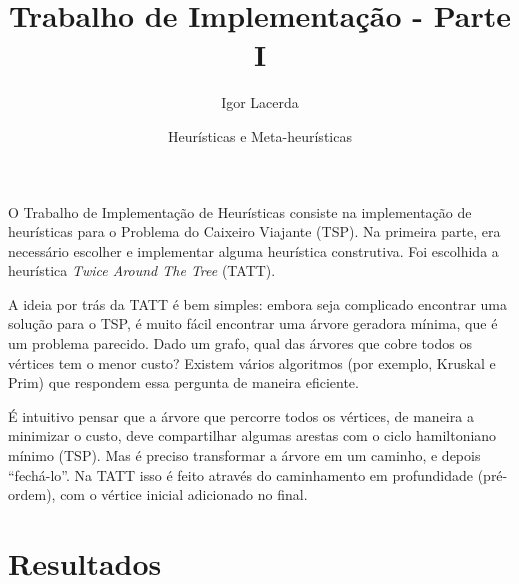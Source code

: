 \documentclass{article}
\author{Igor Lacerda}
\title{Trabalho de Implementação - Parte I}
\date{Heurísticas e Meta-heurísticas}
\begin{document}
\maketitle

O Trabalho de Implementação de Heurísticas consiste na implementação de heurísticas para o Problema do Caixeiro Viajante (TSP). Na primeira parte, era necessário escolher e implementar alguma heurística construtiva. Foi escolhida a heurística \textit{Twice Around The Tree} (TATT).

A ideia por trás da TATT é bem simples: embora seja complicado encontrar uma solução para o TSP, é muito fácil encontrar uma árvore geradora mínima, que é um problema parecido. Dado um grafo, qual das árvores que cobre todos os vértices tem o menor custo? Existem vários algoritmos (por exemplo, Kruskal e Prim) que respondem essa pergunta de maneira eficiente.

É intuitivo pensar que a árvore que percorre todos os vértices, de maneira a minimizar o custo, deve compartilhar algumas arestas com o ciclo hamiltoniano mínimo (TSP). Mas é preciso transformar a árvore em um caminho, e depois ``fechá-lo''. Na TATT isso é feito através do caminhamento em profundidade (pré-ordem), com o vértice inicial adicionado no final.

\section*{Resultados}
\end{document}
